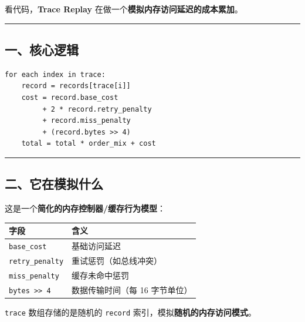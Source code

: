 \documentclass[11pt, a4paper]{article}
\begin{document}
\begin{aibox}
看代码，\textbf{Trace Replay} 在做一个\textbf{模拟内存访问延迟的成本累加}。

\begin{center}\rule{\textwidth}{0.4pt}\end{center}

\subsection*{一、核心逻辑}

\begin{tcolorbox}[colback=white,colframe=gray!50!white,boxrule=0.5pt,arc=2pt,left=5pt,right=5pt,top=5pt,bottom=5pt]
\begin{verbatim}
for each index in trace:
    record = records[trace[i]]
    cost = record.base_cost 
         + 2 * record.retry_penalty 
         + record.miss_penalty 
         + (record.bytes >> 4)
    total = total * order_mix + cost
\end{verbatim}
\end{tcolorbox}

\begin{center}\rule{\textwidth}{0.4pt}\end{center}

\subsection*{二、它在模拟什么}

这是一个\textbf{简化的内存控制器/缓存行为模型}：

\begin{tcolorbox}[colback=white,colframe=gray!50!white,boxrule=0.5pt,arc=2pt,left=5pt,right=5pt,top=5pt,bottom=5pt]
\vspace{0.5em}
\begin{tabularx}{\textwidth}{@{} l X @{}}
\toprule
字段 & 含义 \\
\midrule
\texttt{base\_cost} & 基础访问延迟 \\
\texttt{retry\_penalty} & 重试惩罚（如总线冲突） \\
\texttt{miss\_penalty} & 缓存未命中惩罚 \\
\texttt{bytes >> 4} & 数据传输时间（每 16 字节单位） \\
\bottomrule
\end{tabularx}
\vspace{0.5em}
\end{tcolorbox}

\texttt{trace} 数组存储的是随机的 \texttt{record} 索引，模拟\textbf{随机的内存访问模式}。


\end{aibox}
\end{document}
